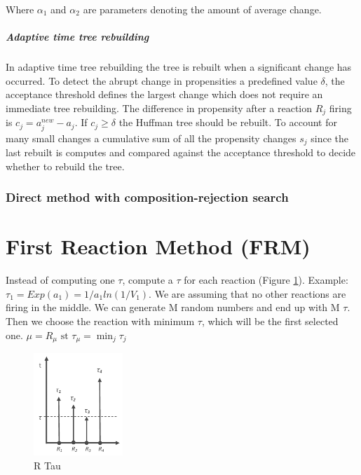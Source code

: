           Where $\alpha_1$ and $\alpha_2$ are parameters denoting the amount of average change.

        \subparagraph{Adaptive time tree rebuilding}
        In adaptive time tree rebuilding the tree is rebuilt when a significant change has occurred.
        To detect the abrupt change in propensities a predefined value $\delta$, the acceptance threshold defines the largest change which does not require an immediate tree rebuilding.
        The difference in propensity after a reaction $R_j$ firing is $c_j = a_j^{new}-a_j$.
        If $c_j \ge \delta$ the Huffman tree should be rebuilt.
        To account for many small changes a cumulative sum of all the propensity changes $s_j$ since the last rebuilt is computes and compared against the acceptance threshold to decide whether to rebuild the tree.

    \subsubsection{Direct method with composition-rejection search}






















\section{First Reaction Method (FRM)}
Instead of computing one $\tau$, compute a $\tau$ for each reaction (Figure \ref{fig:tau}).
Example: $\tau_1 = Exp(a_1)=1/a_1ln(1/V_1)$.
We are assuming that no other reactions are firing in the middle.
We can generate M random numbers and end up with M $\tau$.
Then we choose the reaction with minimum $\tau$, which will be the first selected one.
$\mu= R_{\mu}\text{ st }\tau_{\mu}= \min_{j}\tau_j$

 \begin{figure}
    \centering
    \includegraphics[width=0.3\textwidth]{R_tau.png}
    \caption{R Tau}
    \label{fig:tau}
  \end{figure}

